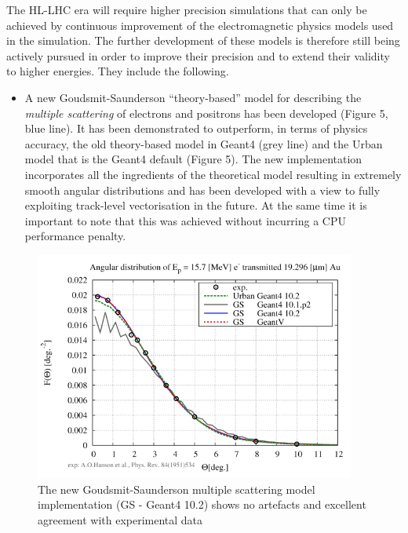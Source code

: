 \documentclass[12pt,a4paper]{article}
\begin{document}
The HL-LHC era will require higher precision simulations that can only
be achieved by continuous improvement of the electromagnetic physics
models used in the simulation. The further development of these models
is therefore still being actively pursued in order to improve their
precision and to extend their validity to higher energies. They include
the following.

\begin{itemize}
\item
  A new Goudsmit-Saunderson ``theory-based'' model for describing the
  \emph{multiple scattering} of electrons and positrons has been
  developed (Figure 5, blue line). It has been demonstrated to
  outperform, in terms of physics accuracy, the old theory-based model
  in Geant4 (grey line) and the Urban model that is the Geant4 default
  (Figure 5). The new implementation incorporates all the ingredients of
  the theoretical model resulting in extremely smooth angular
  distributions and has been developed with a view to fully exploiting
  track-level vectorisation in the future. At the same time it is
  important to note that this was achieved without incurring a CPU
  performance penalty.
\end{itemize}

\begin{figure}[bthp]
\centering
\includegraphics[width=0.94\textwidth]{image5.png}
\caption{The new Goudsmit-Saunderson multiple scattering
model implementation (GS - Geant4 10.2) shows no artefacts and excellent
agreement with experimental data}
\label{fig:gs}
\end{figure}
\end{document}
